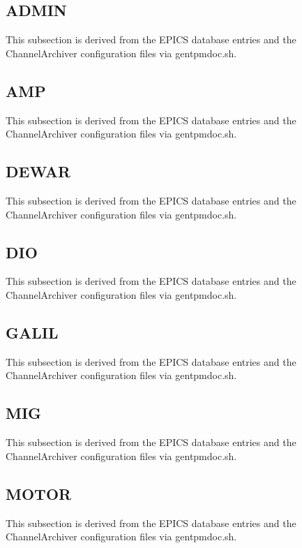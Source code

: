  
\subsection{ADMIN}
 
This subsection is derived from the EPICS database
entries and the ChannelArchiver configuration files
via gentpmdoc.sh.
 
\subsection{AMP}
 
This subsection is derived from the EPICS database
entries and the ChannelArchiver configuration files
via gentpmdoc.sh.
 
\subsection{DEWAR}
 
This subsection is derived from the EPICS database
entries and the ChannelArchiver configuration files
via gentpmdoc.sh.
 
\subsection{DIO}
 
This subsection is derived from the EPICS database
entries and the ChannelArchiver configuration files
via gentpmdoc.sh.
 
\subsection{GALIL}
 
This subsection is derived from the EPICS database
entries and the ChannelArchiver configuration files
via gentpmdoc.sh.
 
\subsection{MIG}
 
This subsection is derived from the EPICS database
entries and the ChannelArchiver configuration files
via gentpmdoc.sh.
 
\subsection{MOTOR}
 
This subsection is derived from the EPICS database
entries and the ChannelArchiver configuration files
via gentpmdoc.sh.
 
